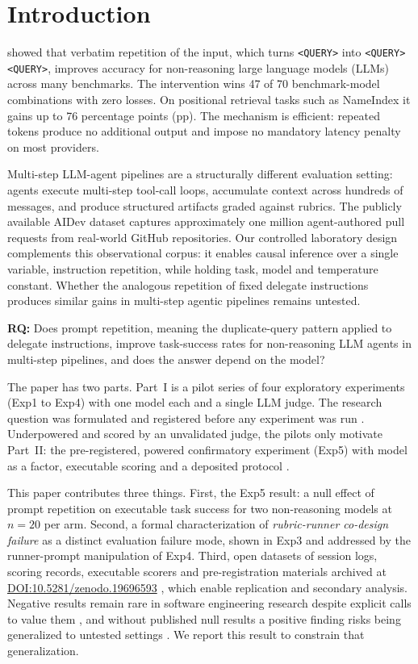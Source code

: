 \documentclass[11pt,a4paper]{article}
\begin{document}
\section{Introduction}

\citet{leviathan2025} showed that verbatim repetition of the input, which turns
\texttt{<QUERY>} into \texttt{<QUERY>\allowbreak<QUERY>}, improves accuracy for
non-reasoning large language models (LLMs) across many benchmarks.
The intervention wins 47 of 70 benchmark-model combinations with zero losses.
On positional retrieval tasks such as NameIndex it gains up to 76 percentage points (pp).
The mechanism is efficient: repeated tokens produce no additional output and impose
no mandatory latency penalty on most providers.

Multi-step LLM-agent pipelines are a structurally different evaluation setting:
agents execute multi-step tool-call loops, accumulate context across hundreds of messages,
and produce structured artifacts graded against rubrics.
The publicly available AIDev dataset \citep{li2026aidev} captures approximately one million
agent-authored pull requests from real-world GitHub repositories.
Our controlled laboratory design complements this observational corpus:
it enables causal inference over a single variable, instruction repetition, while holding task, model and temperature constant.
Whether the analogous repetition of fixed delegate instructions produces similar gains in multi-step agentic pipelines remains untested.

\textbf{RQ:} Does prompt repetition, meaning the duplicate-query pattern applied to delegate instructions, improve task-success rates for non-reasoning LLM agents in multi-step pipelines, and does the answer depend on the model?

The paper has two parts.
Part~I is a pilot series of four exploratory experiments (Exp1 to Exp4) with one model each and a single LLM judge.
The research question was formulated and registered before any experiment was run \citep{kitchenham2002guidelines}.
Underpowered and scored by an unvalidated judge, the pilots only motivate Part~II:
the pre-registered, powered confirmatory experiment (Exp5) with model as a factor, executable scoring and a deposited protocol \citep{clouatre2026prereg}.

This paper contributes three things.
First, the Exp5 result: a null effect of prompt repetition on executable task success for two non-reasoning models at $n{=}20$ per arm.
Second, a formal characterization of \emph{rubric-runner co-design failure} as a distinct evaluation failure mode, shown in Exp3 and addressed by the runner-prompt manipulation of Exp4.
Third, open datasets of session logs, scoring records, executable scorers and pre-registration materials archived at \href{https://doi.org/10.5281/zenodo.19696593}{DOI:10.5281/zenodo.19696593} \citep{clouatre2026dataset}, which enable replication and secondary analysis.
Negative results remain rare in software engineering research despite explicit calls to value them \citep{paige2017negative},
and without published null results a positive finding risks being generalized to untested settings \citep{wieringa2015generalizing}.
We report this result to constrain that generalization.
\end{document}
